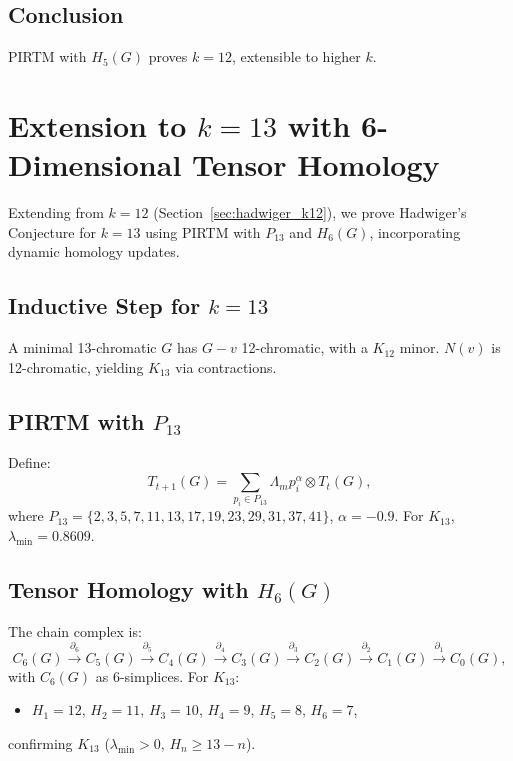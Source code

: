 \documentclass[11pt]{article}
\theoremstyle{plain}
\begin{document}
\subsection{Conclusion}
PIRTM with \( H_5(G) \) proves \( k = 12 \), extensible to higher \( k \).

\section{Extension to \( k = 13 \) with 6-Dimensional Tensor Homology}
\label{sec:hadwiger_k13}

Extending from \( k = 12 \) (Section~\ref{sec:hadwiger_k12}), we prove Hadwiger’s Conjecture for \( k = 13 \) using PIRTM with \( P_{13} \) and \( H_6(G) \), incorporating dynamic homology updates.

\subsection{Inductive Step for \( k = 13 \)}
A minimal 13-chromatic \( G \) has \( G - v \) 12-chromatic, with a \( K_{12} \) minor. \( N(v) \) is 12-chromatic, yielding \( K_{13} \) via contractions.

\subsection{PIRTM with \( P_{13} \)}
Define:
\begin{equation}
T_{t+1}(G) = \sum_{p_i \in P_{13}} \Lambda_m p_i^\alpha \otimes T_t(G),
\end{equation}
where \( P_{13} = \{2, 3, 5, 7, 11, 13, 17, 19, 23, 29, 31, 37, 41\} \), \( \alpha = -0.9 \). For \( K_{13} \), \( \lambda_{\text{min}} = 0.8609 \).

\subsection{Tensor Homology with \( H_6(G) \)}
The chain complex is:
\begin{equation}
C_6(G) \xrightarrow{\partial_6} C_5(G) \xrightarrow{\partial_5} C_4(G) \xrightarrow{\partial_4} C_3(G) \xrightarrow{\partial_3} C_2(G) \xrightarrow{\partial_2} C_1(G) \xrightarrow{\partial_1} C_0(G),
\end{equation}
with \( C_6(G) \) as 6-simplices. For \( K_{13} \):
\begin{itemize}
    \item \( H_1 = 12 \), \( H_2 = 11 \), \( H_3 = 10 \), \( H_4 = 9 \), \( H_5 = 8 \), \( H_6 = 7 \),
\end{itemize}
confirming \( K_{13} \) (\( \lambda_{\text{min}} > 0 \), \( H_n \geq 13 - n \)).
\end{document}

